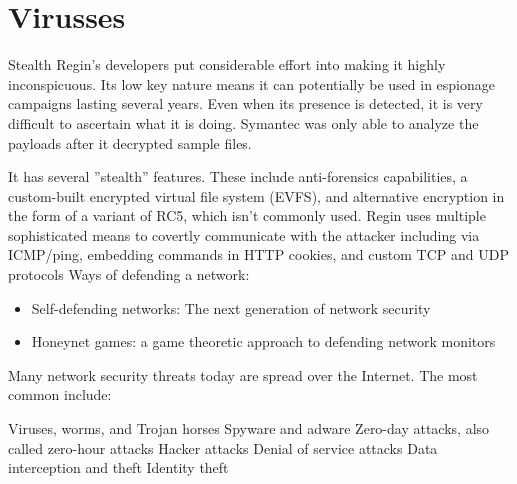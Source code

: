 




\section{Virusses}

Stealth
Regin's developers put considerable effort into making it highly inconspicuous. Its low key nature means it can potentially be used in espionage campaigns lasting several years. Even when its presence is detected, it is very difficult to ascertain what it is doing. Symantec was only able to analyze the payloads after it decrypted sample files.

It has several ''stealth'' features. These include anti-forensics capabilities, a custom-built encrypted virtual file system (EVFS), and alternative encryption in the form of a variant of RC5, which isn't commonly used. Regin uses multiple sophisticated means to covertly communicate with the attacker including via ICMP/ping, embedding commands in HTTP cookies, and custom TCP and UDP protocols
Ways of defending a network:
\begin{itemize}
\item Self-defending networks: The next generation of network security
\item Honeynet games: a game theoretic approach to defending network monitors

\end{itemize}
Many network security threats today are spread over the Internet. The most common include:

Viruses, worms, and Trojan horses
Spyware and adware
Zero-day attacks, also called zero-hour attacks
Hacker attacks
Denial of service attacks
Data interception and theft
Identity theft

